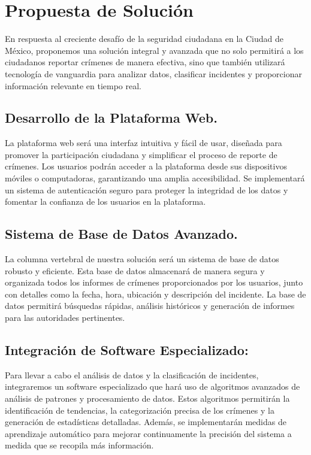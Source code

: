 \documentclass{article}
\begin{document}
\section{Propuesta de Solución}
En respuesta al creciente desafío de la seguridad ciudadana en la Ciudad de México, proponemos una solución integral y avanzada que no solo permitirá a los ciudadanos reportar crímenes de manera efectiva, sino que también utilizará tecnología de vanguardia para analizar datos, clasificar incidentes y proporcionar información relevante en tiempo real.

    \subsection{Desarrollo de la Plataforma Web.}
    La plataforma web será una interfaz intuitiva y fácil de usar, diseñada para promover la participación ciudadana y simplificar el proceso de reporte de crímenes. Los usuarios podrán acceder a la plataforma desde sus dispositivos móviles o computadoras, garantizando una amplia accesibilidad. Se implementará un sistema de autenticación seguro para proteger la integridad de los datos y fomentar la confianza de los usuarios en la plataforma.

    \subsection{Sistema de Base de Datos Avanzado.}
    La columna vertebral de nuestra solución será un sistema de base de datos robusto y eficiente. Esta base de datos almacenará de manera segura y organizada todos los informes de crímenes proporcionados por los usuarios, junto con detalles como la fecha, hora, ubicación y descripción del incidente. La base de datos permitirá búsquedas rápidas, análisis históricos y generación de informes para las autoridades pertinentes.

    \subsection{Integración de Software Especializado:}
    Para llevar a cabo el análisis de datos y la clasificación de incidentes, integraremos un software especializado que hará uso de algoritmos avanzados de análisis de patrones y procesamiento de datos. Estos algoritmos permitirán la identificación de tendencias, la categorización precisa de los crímenes y la generación de estadísticas detalladas. Además, se implementarán medidas de aprendizaje automático para mejorar continuamente la precisión del sistema a medida que se recopila más información.
\end{document}
